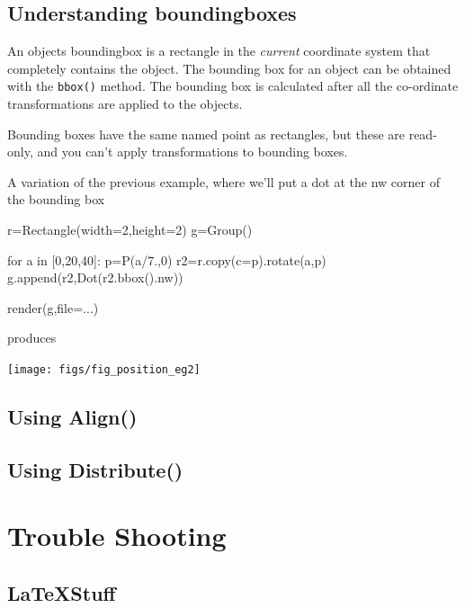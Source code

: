 \documentclass[a4paper]{book}
\begin{document}
\subsection{Understanding boundingboxes}

An objects boundingbox is a rectangle in the \emph{current} coordinate
system that completely contains the object. The bounding box for an object
can be obtained with the \Verb|bbox()| method. The bounding box is calculated
after all the co-ordinate transformations are applied to the objects.

Bounding boxes have the same named point as rectangles, but these are
read-only, and you can't apply transformations to bounding boxes.

\begin{example}
  A variation of the previous example, where we'll put a dot at the
  nw corner of the bounding box
\begin{python}
r=Rectangle(width=2,height=2)
g=Group()

for a in [0,20,40]:
    p=P(a/7.,0)
    r2=r.copy(c=p).rotate(a,p)
    g.append(r2,Dot(r2.bbox().nw))

render(g,file=...)
\end{python}
produces
\begin{center}
  \texttt{[image: figs/fig\_position\_eg2]}
\end{center}
\end{example}


\subsection{Using Align()}

\subsection{Using Distribute()}

\section{Trouble Shooting}

\subsection{\LaTeX Stuff}
\end{document}

